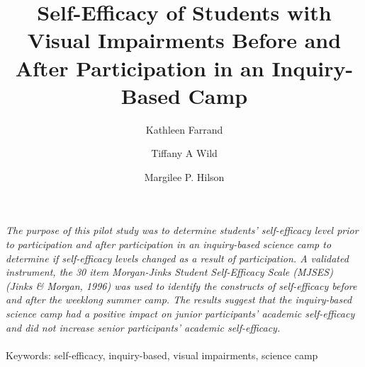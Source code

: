 \documentclass[11.5pt]{sig-alternate} %
\makeatletter
\let\oldabstract\abstract
\let\oldendabstract\endabstract
\renewenvironment{abstract} %
{\renewenvironment{quotation}%
               {\list{}{\addtolength{\leftmargin}{1em} %
                        \listparindent 1.5em%
                        \itemindent    \listparindent%
                        \rightmargin   \leftmargin%
                        \parsep        \z@ \@plus\p@}%
                \item\relax}%
               {\endlist}%
\oldabstract}
{\oldendabstract}
\makeatother
\begin{document}
\title{Self-Efficacy of Students with Visual Impairments Before and After Participation in an Inquiry-Based Camp}

\author[1]{\large \color{blue}Kathleen Farrand}
\author[2]{\large \color{blue}Tiffany A Wild}
\author[3]{\large \color{blue}Margilee P. Hilson}


\toappear{}
\maketitle
\begin{@twocolumnfalse} 
\begin{abstract}
\item 
\textit{The purpose of this pilot study was to determine students’ self-efficacy level prior to participation and after participation in an inquiry-based science camp to determine if self-efficacy levels changed as a result of participation. A validated instrument, the 30 item Morgan-Jinks Student Self-Efficacy Scale (MJSES) (Jinks \& Morgan, 1996) was used to identify the constructs of self-efficacy before and after the weeklong summer camp. The results suggest that the inquiry-based science camp had a positive impact on junior participants’ academic self-efficacy and did not increase senior participants’ academic self-efficacy.}
\\ \\
Keywords: self-efficacy, inquiry-based, visual impairments, science camp
\end{abstract}
\end{@twocolumnfalse}

\end{document}
